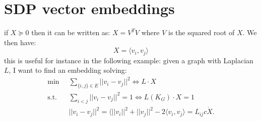 \documentclass[11pt]{article}
\begin{document}
\section*{SDP vector embeddings}
if $X \succeq 0$ then it can be written as: $X = V^TV$ where $V$ is the squared root of $X$. We then have:
\[
    X = \langle v_i, v_j \rangle
\]
this is useful for instance in the following example: given a graph with Laplacian $L$, I want to find an embedding solving:
\begin{align*}
    \min \; & \; \sum_{\{i,j\} \in E} ||v_i - v_j||^2 \iff L \cdot X\\
    \text{s.t.} \;&\; \sum_{i < j } ||v_i - v_j ||^2 = 1 \iff L(K_G) \cdot X = 1\\
    & \;||v_i - v_j||^2 = \langle ||v_i||^2 + 
    ||v_j ||^2 - 2 \langle v_i, v_j \rangle = L_{ij}c\dot X.
\end{align*}
\end{document}
